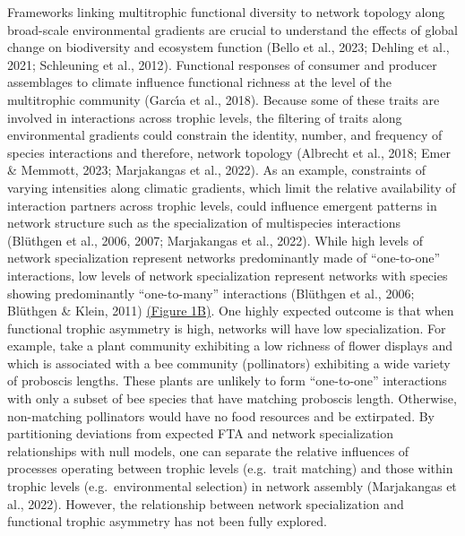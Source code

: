 \documentclass[
]{agujournal2019}
\begin{document}
Frameworks linking multitrophic functional diversity to network topology
along broad-scale environmental gradients are crucial to understand the
effects of global change on biodiversity and ecosystem function (Bello
et al., 2023; Dehling et al., 2021; Schleuning et al., 2012). Functional
responses of consumer and producer assemblages to climate influence
functional richness at the level of the multitrophic community (Garcı́a
et al., 2018). Because some of these traits are involved in interactions
across trophic levels, the filtering of traits along environmental
gradients could constrain the identity, number, and frequency of species
interactions and therefore, network topology (Albrecht et al., 2018;
Emer \& Memmott, 2023; Marjakangas et al., 2022). As an example,
constraints of varying intensities along climatic gradients, which limit
the relative availability of interaction partners across trophic levels,
could influence emergent patterns in network structure such as the
specialization of multispecies interactions (Blüthgen et al., 2006,
2007; Marjakangas et al., 2022). While high levels of network
specialization represent networks predominantly made of ``one-to-one''
interactions, low levels of network specialization represent networks
with species showing predominantly ``one-to-many'' interactions
(Blüthgen et al., 2006; Blüthgen \& Klein, 2011)
\hyperref[fig-01]{(Figure 1B)}. One highly expected outcome is that when
functional trophic asymmetry is high, networks will have low
specialization. For example, take a plant community exhibiting a low
richness of flower displays and which is associated with a bee community
(pollinators) exhibiting a wide variety of proboscis lengths. These
plants are unlikely to form ``one-to-one'' interactions with only a
subset of bee species that have matching proboscis length. Otherwise,
non-matching pollinators would have no food resources and be extirpated.
By partitioning deviations from expected FTA and network specialization
relationships with null models, one can separate the relative influences
of processes operating between trophic levels (e.g.~trait matching) and
those within trophic levels (e.g.~environmental selection) in network
assembly (Marjakangas et al., 2022). However, the relationship between
network specialization and functional trophic asymmetry has not been
fully explored.
\end{document}
